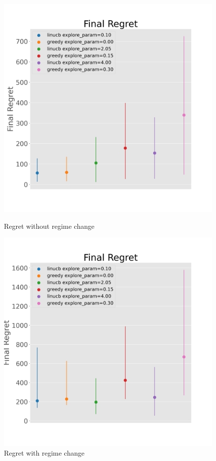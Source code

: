 \documentclass{article}
\begin{document}
\begin{figure}[!h]
  \centering
  \begin{minipage}{.45\textwidth}
    \centering
    \includegraphics[width=\linewidth]{epsilon_vs_linucb_blobs}
    \caption{Regret without regime change}\label{fig:linucb-blobs-regret-no-regime-change}
  \end{minipage}%
  \begin{minipage}{.45\textwidth}
    \centering
    \includegraphics[width=\linewidth]{epsilon_vs_linucb_blobs_regime_change}
    \caption{Regret with regime change}\label{fig:linucb-blobs-regret-regime-change}
  \end{minipage}
\end{figure}
\end{document}
